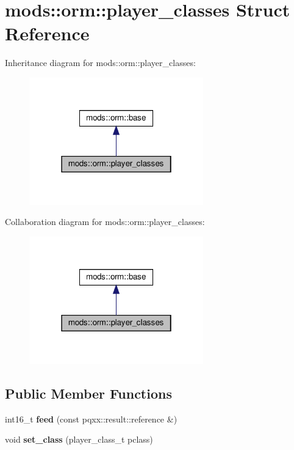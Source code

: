 \hypertarget{structmods_1_1orm_1_1player__classes}{}\section{mods\+:\+:orm\+:\+:player\+\_\+classes Struct Reference}
\label{structmods_1_1orm_1_1player__classes}


Inheritance diagram for mods\+:\+:orm\+:\+:player\+\_\+classes\+:
\nopagebreak
\begin{figure}[H]
\begin{center}
\leavevmode
\includegraphics[width=214pt]{structmods_1_1orm_1_1player__classes__inherit__graph}
\end{center}
\end{figure}


Collaboration diagram for mods\+:\+:orm\+:\+:player\+\_\+classes\+:
\nopagebreak
\begin{figure}[H]
\begin{center}
\leavevmode
\includegraphics[width=214pt]{structmods_1_1orm_1_1player__classes__coll__graph}
\end{center}
\end{figure}
\subsection*{Public Member Functions}
\begin{DoxyCompactItemize}
\item 
\mbox{\label{structmods_1_1orm_1_1player__classes_a6b1d1db3a5e04bfb39793c80a7fd9a75}} 
int16\+\_\+t {\bfseries feed} (const pqxx\+::result\+::reference \&)
\item 
\mbox{\label{structmods_1_1orm_1_1player__classes_a49f164f7ebf205b3fb616bc46e2568b2}} 
void {\bfseries set\+\_\+class} (player\+\_\+class\+\_\+t pclass)
\end{DoxyCompactItemize}
